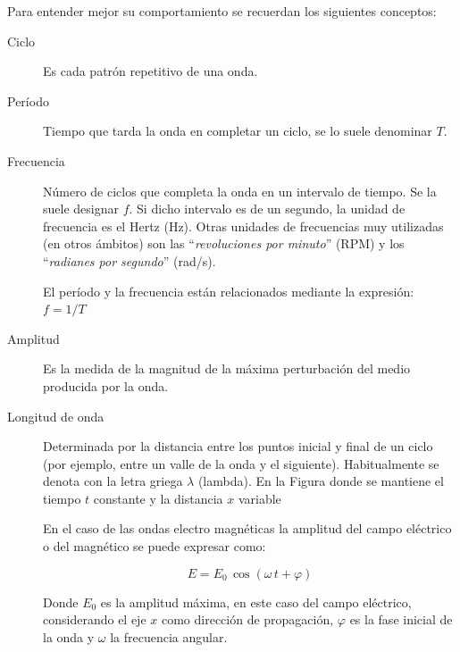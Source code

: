 





Para entender mejor su comportamiento se recuerdan los siguientes conceptos:

\begin{description}
\item [Ciclo] Es cada patr\'on repetitivo de una onda.

\item  [Per\'iodo] Tiempo que tarda la onda en completar un ciclo, se lo suele denominar $T$.

\item  [Frecuencia] N\'umero de ciclos que completa la onda en un intervalo de
  tiempo. Se la suele designar $f$.
  Si dicho intervalo es de un segundo, la unidad de frecuencia
  es el Hertz (Hz). Otras unidades de frecuencias muy utilizadas (en
  otros \'ambitos) son las ``\textit{revoluciones por minuto}'' (RPM) y los
  ``\textit{radianes por segundo}'' (rad/s).

El per\'iodo y la frecuencia est\'an relacionados mediante la expresión: $ f = 1/T $

\item [Amplitud] Es la medida de la magnitud de la m\'axima perturbaci\'on del medio producida por la onda.

\item [Longitud de onda] Determinada por la distancia entre los puntos inicial y final de un ciclo (por ejemplo, entre un valle de la onda y el siguiente). Habitualmente se denota con la letra griega $\lambda$ (lambda).
En la Figura
donde se mantiene el tiempo $t$ constante y la distancia $x$ variable 


En el caso de las ondas electro magn\'eticas 
la amplitud del campo el\'ectrico o del magn\'etico se puede expresar como:

\[ E = E_0 \,\cos{(     \omega \,t + \varphi)}
\]

Donde $E_0$ es la amplitud m\'axima, en este caso del campo el\'ectrico,  considerando el eje $x$
como direcci\'on de propagaci\'on, 
$\varphi$ es la fase inicial
de la onda y $\omega$ la frecuencia angular.


\end{description}
